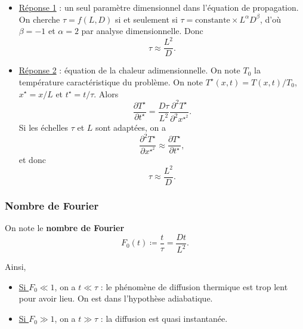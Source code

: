         \begin{itemize}
            \item \underline{Réponse 1} : un seul paramètre dimensionnel dans l'équation de propagation. On cherche $\tau=f(L,D)$ si et seulement si $\tau=\mathrm{constante}\times L^{\alpha}D^{\beta}$, d'où $\beta=-1$ et $\alpha=2$ par analyse dimensionnelle. Donc
            \begin{equation*}
                \boxed{
                    \tau\approx\frac{L^{2}}{D}.
                }
            \end{equation*}

            \item \underline{Réponse 2} : équation de la chaleur adimensionnelle. On note $T_0$ la température caractéristique du problème. On note $T^{\star}(x,t)=T(x,t)/T_0$, $x^{\star}=x/L$ et $t^{\star}=t/\tau$. Alors
            \begin{equation*}
                \frac{\partial T^{\star}}{\partial t^{\star}}=\frac{D\tau}{L^{2}}\frac{\partial^{2}T^{\star}}{\partial^{2}x^{{\star}^{2}}}.
            \end{equation*}
            Si les échelles $\tau$ et $L$ sont adaptées, on a 
            \begin{equation*}
                \frac{\partial^{2}T^{\star}}{\partial x^{{\star}^{2}}}\approx\frac{\partial T^{\star}}{\partial t^{\star}},
            \end{equation*}
            et donc 
            \begin{equation*}
                \boxed{
                    \tau\approx\frac{L^{2}}{D}.
                }
            \end{equation*}
        \end{itemize}

        \subsubsection{Nombre de Fourier}
            On note le \textbf{nombre de Fourier}
            \begin{equation*}
                F_0(t)\coloneqq\frac{t}{\tau}=\frac{Dt}{L^{2}}.
            \end{equation*}

            Ainsi,
            \begin{itemize}
                \item \underline{Si $F_0\ll1$}, on a $t\ll\tau$ : le phénomène de diffusion thermique est trop lent pour avoir lieu. On est dans l'hypothèse adiabatique.
                \item \underline{Si $F_0\gg1$}, on a $t\gg\tau$ : la diffusion est quasi instantanée.
            \end{itemize}

